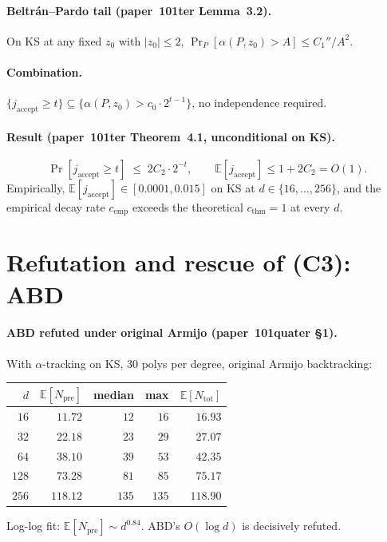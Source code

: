 \documentclass[11pt,a4paper]{article}
\begin{document}
\paragraph{Beltr\'an--Pardo tail (paper~101ter Lemma~3.2).} On KS at any fixed $z_0$ with $|z_0| \le 2$,
$\Pr_{P}[\alpha(P, z_0) > A] \le C_1''/A^2$.

\paragraph{Combination.}
$\{j_{\text{accept}} \ge t\} \subseteq \{\alpha(P, z_0) > c_0 \cdot 2^{t-1}\}$, no independence required.

\paragraph{Result (paper~101ter Theorem~4.1, unconditional on KS).}
\begin{equation}\label{eq:jaccept}
\Pr[j_{\text{accept}} \ge t] \;\le\; 2C_2 \cdot 2^{-t}, \qquad \mathbb{E}[j_{\text{accept}}] \le 1 + 2C_2 = O(1).
\end{equation}
Empirically, $\mathbb{E}[j_{\text{accept}}] \in [0.0001, 0.015]$ on KS at $d \in \{16, \dots, 256\}$, and the empirical decay rate $c_{\text{emp}}$ exceeds the theoretical $c_{\text{thm}} = 1$ at every $d$.

\section{Refutation and rescue of (C3): ABD}\label{sec:ABD}

\paragraph{ABD refuted under original Armijo (paper~101quater \S1).}
With $\alpha$-tracking on KS, $30$ polys per degree, original Armijo backtracking:
\begin{center}
\begin{tabular}{rrrrr}
\toprule
$d$ & $\mathbb{E}[N_{\text{pre}}]$ & median & max & $\mathbb{E}[N_{\text{tot}}]$ \\
\midrule
$16$  & $11.72$  & $12$  & $16$  & $16.93$ \\
$32$  & $22.18$  & $23$  & $29$  & $27.07$ \\
$64$  & $38.10$  & $39$  & $53$  & $42.35$ \\
$128$ & $73.28$  & $81$  & $85$  & $75.17$ \\
$256$ & $118.12$ & $135$ & $135$ & $118.90$ \\
\bottomrule
\end{tabular}
\end{center}
Log-log fit: $\mathbb{E}[N_{\text{pre}}] \sim d^{0.84}$. ABD's $O(\log d)$ is decisively refuted.
\end{document}

